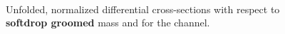 \begin{figure}[htp!]
\begin{subfigure}
    \end{subfigure} \\
    \caption{Unfolded, normalized differential cross-sections with respect to \textbf{softdrop groomed} mass and \pt for the  channel.}
    \label{fig:trijetresultsbinned_g}
  \end{figure}
  \newpage



